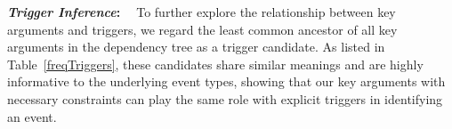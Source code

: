 

\vspace{2mm}

\noindent\textbf{\emph{Trigger Inference}: \mbox{ }} To further explore the relationship between key arguments and triggers, we regard the
least common ancestor of all key arguments in the dependency tree as a trigger candidate. As listed in Table~\ref{freqTriggers}, these
candidates share similar meanings and are highly informative to the underlying event types, showing that our key arguments with necessary
constraints can play the same role with explicit triggers in identifying an event.

